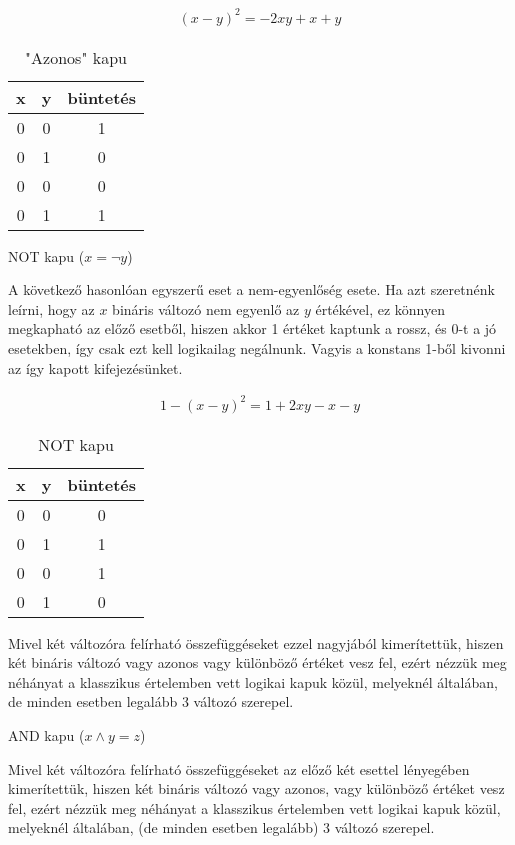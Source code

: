 \begin{align}
	(x-y)^2=-2xy+x+y
\end{align}

\begin{table}[ht]
	\footnotesize
	\centering
	\begin{tabular}{ c c c }
		\toprule
		x & y & büntetés \\
		\midrule
		0 & 0 & 1 \\
		0 & 1 & 0 \\
		0 & 0 & 0 \\
		0 & 1 & 1 \\		
		\bottomrule
	\end{tabular}
	\caption{"Azonos" kapu}
	\label{tab:SAMEgate}
\end{table}

NOT kapu ($x= \neg y$)

A következő hasonlóan egyszerű eset a nem-egyenlőség esete. Ha azt szeretnénk leírni, hogy az $x$ bináris változó nem egyenlő az $y$ értékével, ez könnyen megkapható az előző esetből, hiszen akkor 1 értéket kaptunk a rossz, és 0-t a jó esetekben, így csak ezt kell logikailag negálnunk. Vagyis a konstans 1-ből kivonni az így kapott kifejezésünket.



\begin{align}
	1-(x-y)^2=1+2xy-x-y
\end{align}

\begin{table}[ht]
	\footnotesize
	\centering
	\begin{tabular}{ c c c }
		\toprule
		x & y & büntetés \\
		\midrule
		0 & 0 & 0 \\
		0 & 1 & 1 \\
		0 & 0 & 1 \\
		0 & 1 & 0 \\		
		\bottomrule
	\end{tabular}
	\caption{NOT kapu}
	\label{tab:NOTgate}
\end{table}

Mivel két változóra felírható összefüggéseket ezzel nagyjából kimerítettük, hiszen két bináris változó vagy azonos vagy különböző értéket vesz fel, ezért nézzük meg néhányat a klasszikus értelemben vett logikai kapuk közül, melyeknél általában, de minden esetben legalább 3 változó szerepel.

AND kapu ($x \wedge y = z$)

Mivel két változóra felírható összefüggéseket az előző két esettel lényegében kimerítettük, hiszen két bináris változó vagy azonos, vagy különböző értéket vesz fel, ezért nézzük meg néhányat a klasszikus értelemben vett logikai kapuk közül, melyeknél általában, (de minden esetben legalább) 3 változó szerepel.


